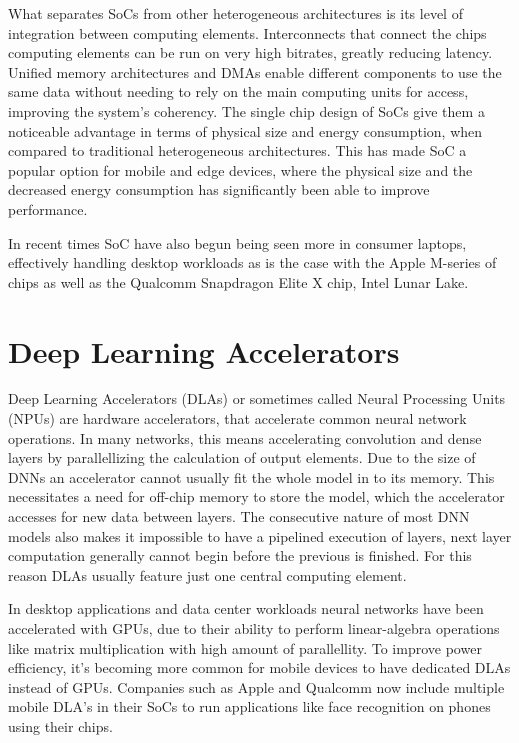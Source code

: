 \documentclass[12pt,a4paper,english
]{tunithesis}
\begin{document}
What separates SoCs from other heterogeneous architectures is its level of integration between computing elements. Interconnects that connect the chips computing elements can be run on very high bitrates, greatly reducing latency. Unified memory architectures and DMAs enable different components to use the same data without needing to rely on the main computing units for access, improving the system's coherency. The single chip design of SoCs give them a noticeable advantage in terms of physical size and energy consumption, when compared to traditional heterogeneous architectures. This has made SoC a popular option for mobile and edge devices, where the physical size and the decreased energy consumption has significantly been able to improve performance.

In recent times SoC have also begun being seen more in consumer laptops, effectively handling desktop workloads as is the case with the Apple M-series of chips as well as the Qualcomm Snapdragon Elite X chip, Intel Lunar Lake.

\cite{di_natale_moving_2010}

\section{Deep Learning Accelerators}
\label{sec:dlas}
Deep Learning Accelerators (DLAs) or sometimes called Neural Processing Units (NPUs) are hardware accelerators, that accelerate common neural network operations. In many networks, this means accelerating convolution and dense layers by parallellizing the calculation of output elements. Due to the size of DNNs an accelerator cannot usually fit the whole model in to its memory. This necessitates a need for off-chip memory to store the model, which the accelerator accesses for new data between layers. The consecutive nature of most DNN models also makes it impossible to have a pipelined execution of layers, next layer computation generally cannot begin before the previous is finished. For this reason DLAs usually feature just one central computing element.

In desktop applications and data center workloads neural networks have been accelerated with GPUs, due to their ability to perform linear-algebra operations like matrix multiplication with high amount of parallellity. To improve power efficiency, it's becoming more common for mobile devices to have dedicated DLAs instead of GPUs. Companies such as Apple and Qualcomm now include multiple mobile DLA's in their SoCs to run applications like face recognition on phones using their chips.
\end{document}
